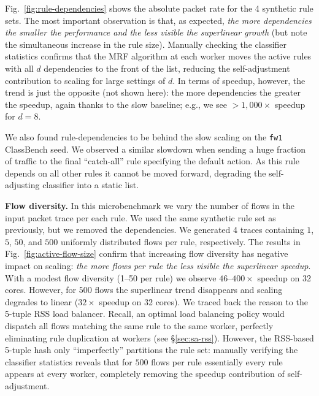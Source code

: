 Fig.~\ref{fig:rule-dependencies} shows the absolute packet rate for the 4 synthetic rule sets. The most important observation is that, as expected, \emph{the more dependencies the smaller the performance and the less visible the superlinear growth} (but note the simultaneous increase in the rule size). Manually checking the classifier statistics confirms that the MRF algorithm at each worker moves the active rules with all $d$ dependencies to the front of the list, reducing the self-adjustment contribution to scaling for large settings of $d$. In terms of speedup, however, the trend is just the opposite (not shown here): the more dependencies the greater the speedup, again thanks to the slow baseline; e.g., we see $>1,000\times$ speedup for $d=8$.

We also found rule-dependencies to be behind the slow scaling on the \texttt{fw1} ClassBench seed. We observed a similar slowdown when sending a huge fraction of traffic to the final ``catch-all'' rule specifying the default action. As this rule depends on all other rules it cannot be moved forward, degrading the self-adjusting classifier into a static list.

\noindent
\textbf{Flow diversity.} %
In this microbenchmark we vary the number of flows in the input packet trace per each rule. We used the same synthetic rule set as previously, but we removed the dependencies. We generated 4 traces containing $1$, $5$, $50$, and $500$ uniformly distributed flows per rule, respectively. The results in Fig.~\ref{fig:active-flow-size} confirm that increasing flow diversity has negative impact on scaling: \emph{the more flows per rule the less visible the superlinear speedup}. With a modest flow diversity (1--50 per rule) we observe $46$--$400\times$ speedup on 32 cores. However, for $500$ flows the superlinear trend disappears and scaling degrades to linear ($32\times$ speedup on 32 cores).  We traced back the reason to the 5-tuple RSS load balancer. Recall, an optimal load balancing policy would dispatch all flows matching the same rule to the same worker, perfectly eliminating rule duplication at workers (see \S\ref{sec:sa-rss}). However, the RSS-based 5-tuple hash only ``imperfectly'' partitions the rule set: manually verifying the classifier statistics reveals that for $500$ flows per rule essentially every rule appears at every worker, completely removing the speedup contribution of self-adjustment. %

